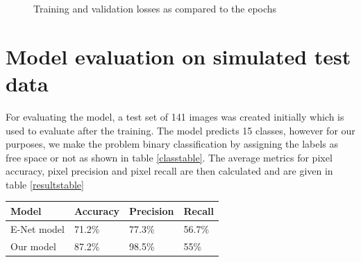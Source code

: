 \documentclass[a4paper, 12pt, oneside, BCOR1cm,toc=chapterentrywithdots]{scrbook}
\begin{document}
\begin{figure}[h] 
\caption{Training and validation losses as compared to the epochs} \label{loss}
\end{figure}

\newpage

\section{Model evaluation on simulated test data}


For evaluating the model, a test set of 141 images was created initially which is used to evaluate after the training. The model predicts 15 classes, however for our purposes, we make the problem binary classification by assigning the labels as free space or not as shown in table \ref{classtable}. The average metrics for pixel accuracy, pixel precision and pixel recall are then calculated and are given in table \ref{resultstable}

\begin{center}
\label{resultstable}
\begin{tabular}{| l | l | l | l |}
\hline
Model & Accuracy & Precision & Recall\\
\hline
E-Net model & 71.2\% & 77.3\% & 56.7\%\\
\hline
Our model & 87.2\%  & 98.5\% & 55\%\\
\hline
\end{tabular}

\end{center}
\end{document}
